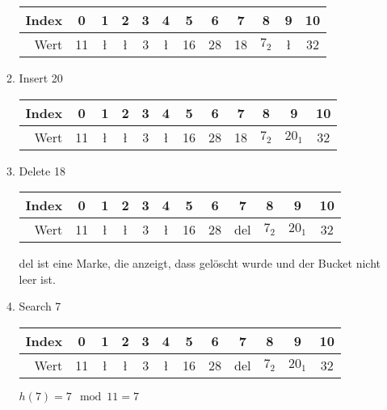 \documentclass{bschlangaul-aufgabe}
\begin{document}
\begin{enumerate}
\begin{enumerate}
\begin{bAntwort}
\begin{tabular}{|r||c|c|c|c|c|c|c|c|c|c|c|}
Index & 0  & 1  & 2  & 3 & 4  & 5  & 6  & 7  & 8  & 9  & 10 \\\hline
Wert  & 11 & \l & \l & 3 & \l & 16 & 28 & 18 & $7_2$ & \l & 32 \\
\end{tabular}
\end{bAntwort}


\item Insert 20

\begin{bAntwort}
\begin{tabular}{|r||c|c|c|c|c|c|c|c|c|c|c|}
Index & 0  & 1  & 2  & 3 & 4  & 5  & 6  & 7  & 8     & 9      & 10 \\\hline
Wert  & 11 & \l & \l & 3 & \l & 16 & 28 & 18 & $7_2$ & $20_1$ & 32 \\
\end{tabular}
\end{bAntwort}


\item Delete 18

\begin{bAntwort}
\begin{tabular}{|r||c|c|c|c|c|c|c|c|c|c|c|}
Index & 0  & 1  & 2  & 3 & 4  & 5  & 6  & 7  & 8     & 9      & 10 \\\hline
Wert  & 11 & \l & \l & 3 & \l & 16 & 28 & del & $7_2$ & $20_1$ & 32 \\
\end{tabular}

del ist eine Marke, die anzeigt, dass gelöscht wurde und der Bucket
nicht leer ist.
\end{bAntwort}


\item Search 7

\begin{bAntwort}
\begin{tabular}{|r||c|c|c|c|c|c|c|c|c|c|c|}
Index & 0  & 1  & 2  & 3 & 4  & 5  & 6  & 7  & 8     & 9      & 10 \\\hline
Wert  & 11 & \l & \l & 3 & \l & 16 & 28 & del & $7_2$ & $20_1$ & 32 \\
\end{tabular}

$h(7) = 7 \mod 11 = 7$


\end{bAntwort}
\end{enumerate}
\end{enumerate}
\end{document}

